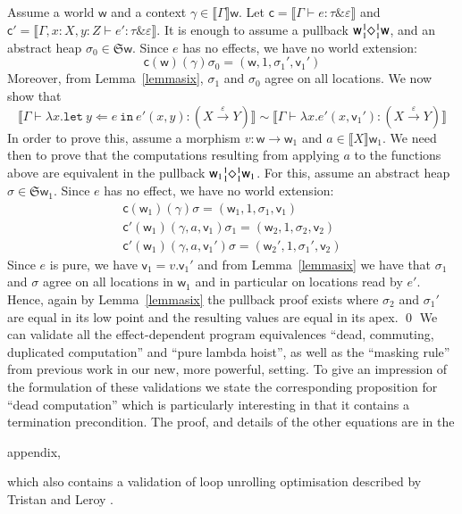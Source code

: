 \documentclass[orivec]{llncs}
\newif\ifapp\apptrue
\newcommand{\keywd}[1]{\mathtt{#1}}
\newcommand{\sq}[4]{\tensor*[^{#1}_{#2}]{\Diamond}{^{#3}_{#4}}}
\newcommand{\effto}[1]{\stackrel{#1}{\to}}
\newcommand{\letin}[2]{\keywd{let}\:{#1}\!\Leftarrow\!{#2}\:\keywd{in}\:}
\newcommand{\eff}{\varepsilon}
\newcommand{\sem}[1]{\ensuremath{\llbracket {#1} \rrbracket}}
\renewenvironment{proof}{\vspace{-1mm} \noindent {\bf Proof}\quad}{\qed}
\newcommand\w{\ensuremath{\mathsf{w}}\xspace}
\newcommand{\Astores}{\mathfrak{S}}
\newcommand\val{\ensuremath{\mathsf{v}}\xspace}
\newcommand\cval{\ensuremath{\mathsf{c}}\xspace}
\newcommand{\ety}[2]{{#1}\mathrel{\&}{#2}}
\newcommand{\valty}[1]{#1}
\begin{document}
\begin{proof}
Assume a world \w and a context $\gamma \in \sem{\Gamma}\w$.
Let $\cval = \sem{\Gamma \vdash e : \ety{\tau}{\eff}}$ and 
$\cval' = \sem{\Gamma, x: X, y: Z \vdash e' : \ety{\tau}{\eff}}$. 
It is enough to assume a pullback 
$\w \sq{1}{1}{1}{1} \w$, and an abstract heap $\sigma_0 \in
\Astores \w$. Since $e$ has no effects, we have no world extension:
\[
 \cval(\w)(\gamma)\sigma_0  =  (\w, 1, \sigma_1', \val_1') 
\]
Moreover, from Lemma~\ref{lemmasix}, $\sigma_1$ and $\sigma_0$ agree on
all locations. We now show that 
\[
\sem{\Gamma\vdash  \lambda x.\letin{y}{e} {e'(x,y)} : (\valty{X\effto\eff
Y})}
\sim
\sem{\Gamma\vdash \lambda x.e'(x,\val_1') : (\valty{X\effto\eff
Y})}
\]
In order to prove this, assume a morphism $v : \w \to \w_1$ and $a \in
\sem{X}\w_1$. We need then to prove that the computations resulting from 
applying $a$ to the functions above are equivalent in the pullback
$\w_1\sq{1}{1}{1}{1}\w_1$. For this, assume an abstract heap $\sigma \in
\Astores \w_1$. Since $e$ has no effect, we have no world extension:
\[
\begin{array}{l}
 \cval(\w_1)(\gamma)\sigma  =  (\w_1, 1, \sigma_1, \val_1) \\
 \cval'(\w_1)(\gamma, a, \val_1 )\sigma_1  =  (\w_2, 1, \sigma_2, \val_2)\\
\cval'(\w_1)(\gamma, a, \val_1' )\sigma  =  (\w_2', 1, \sigma_1', \val_2)
\end{array}
\]
Since $e$ is pure, we have $\val_1 = v.\val_1'$ and from
Lemma~\ref{lemmasix} we have that $\sigma_1$ and $\sigma$ agree on all
locations in $\w_1$ and in particular on locations read by $e'$. Hence, 
again by Lemma~\ref{lemmasix} the pullback proof exists where $\sigma_2$
and 
$\sigma_1'$ are equal in its low point and the resulting values are equal
in its apex.
\end{proof}
\else
We can validate all the effect-dependent program equivalences ``dead,
commuting, duplicated computation'' and ``pure lambda hoist'', as well
as the ``masking rule'' from previous work \cite{DBLP:conf/aplas/BentonKHB06} in our new, more powerful,
setting.
To give an impression of the
formulation of these validations we state the corresponding proposition for
``dead computation'' which is particularly interesting in that it contains
a termination precondition. The proof, and details of the other
equations are in the 
\ifapp
appendix,
\else
long version, 
\fi
which also 
contains a validation of loop unrolling optimisation 
described by Tristan and Leroy \cite{tristan10popl}. 
\end{document}
